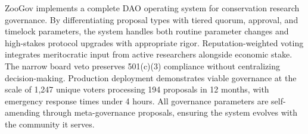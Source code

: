 \documentclass[11pt,letterpaper]{article}
\begin{document}
ZooGov implements a complete DAO operating system for conservation research governance. By differentiating proposal types with tiered quorum, approval, and timelock parameters, the system handles both routine parameter changes and high-stakes protocol upgrades with appropriate rigor. Reputation-weighted voting integrates meritocratic input from active researchers alongside economic stake. The narrow board veto preserves 501(c)(3) compliance without centralizing decision-making. Production deployment demonstrates viable governance at the scale of 1{,}247 unique voters processing 194 proposals in 12 months, with emergency response times under 4 hours. All governance parameters are self-amending through meta-governance proposals, ensuring the system evolves with the community it serves.

\end{document}
